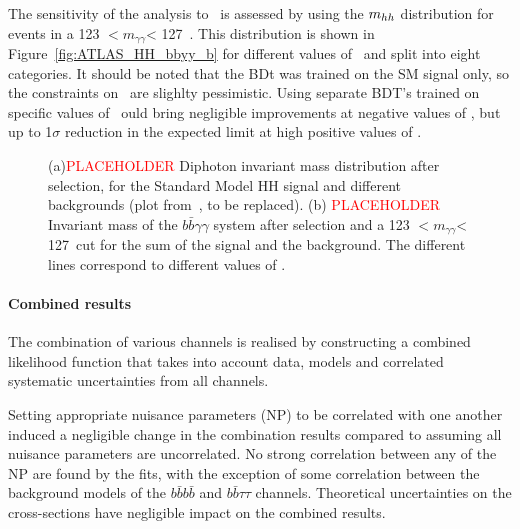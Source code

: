 The sensitivity of the analysis to \kl\ is assessed by using the $m_{hh}$ distribution for events in a 123 $ < \ensuremath{m_{\gamma\gamma}} $< 127~\UGeV. This distribution is shown in Figure~\ref{fig:ATLAS_HH_bbyy_b} for different values of \kl\ and split into eight categories. It should be noted that the BDt was trained on the SM signal only, so the constraints on \kl\ are slighlty pessimistic. Using separate BDT's trained on specific values of \kl\ ould bring negligible improvements at negative values of \kl, but up to 1$\sigma$ reduction in the expected limit at high positive values of \kl.



\begin{figure}[!htb]
\centering 
{} 
\caption{(a)\textcolor{red}{PLACEHOLDER} Diphoton invariant mass distribution after selection, for the Standard Model HH signal and different backgrounds (plot from~\cite{ITKPixelTDR}, to be replaced). (b) \textcolor{red}{PLACEHOLDER} Invariant mass of the $b\bar{b}\gamma\gamma$ system after selection and a 123 $ < \ensuremath{m_{\gamma\gamma}} $< 127~\UGeV cut for the sum of the signal and the background. The different lines correspond to different values of \kl.} 
\label{fig:ATLAS_HH_bbyy} 
\end{figure}


%
\paragraph{Combined results}


The combination of various channels is realised by constructing a combined likelihood function that takes into account data, models and correlated systematic uncertainties from all channels. 

Setting appropriate nuisance parameters (NP) to be correlated with one another induced a negligible change in the combination results compared to assuming all nuisance parameters are uncorrelated. No strong correlation between any of the NP are found by the fits, with the exception of some correlation between the background models of the $b\bar{b}b\bar{b}$ and $b\bar{b}\tau\tau$ channels. Theoretical uncertainties on the cross-sections have negligible impact on the combined results.

